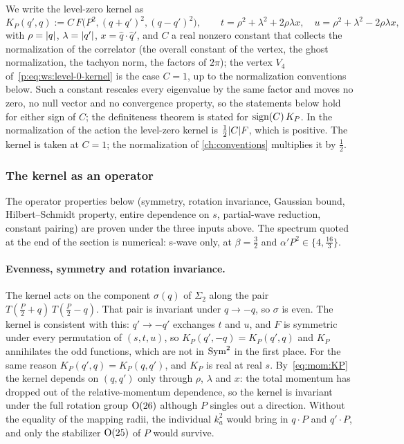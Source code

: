 We write the level-zero kernel as
\begin{equation}
  \label{eq:mom:KP}
  K_P(q', q)
    := C \, F\big( P^2, (q + q')^2, (q - q')^2 \big),
  \qquad
  t
    = \rho^2 + \lambda^2 + 2 \rho \lambda x,
  \quad
  u
    = \rho^2 + \lambda^2 - 2 \rho \lambda x,
\end{equation}
with $\rho = {|q|}$, $\lambda = {|q'|}$, $x = \hat q \cdot \hat q'$, and $C$ a real nonzero constant that collects the normalization of the correlator (the overall constant of the vertex, the ghost normalization, the tachyon norm, the factors of $2\pi$); the vertex $V_4$ of~\eqref{p:eq:ws:level-0-kernel} is the case $C = 1$, up to the normalization conventions below.
Such a constant rescales every eigenvalue by the same factor and moves no zero, no null vector and no convergence property, so the statements below hold for either sign of $C$; the definiteness theorem is stated for $\operatorname{sign}(C) \, K_P$.
In the normalization of the action the level-zero kernel is $\tfrac{1}{2} {|C|} F$, which is positive.
The kernel is taken at $C = 1$; the normalization of \cref{ch:conventions} multiplies it by $\tfrac{1}{2}$.

\subsubsection{The kernel as an operator}
\label{sec:mom:hs}


The operator properties below (symmetry, rotation invariance, Gaussian bound, Hilbert--Schmidt property, entire dependence on $s$, partial-wave reduction, constant pairing) are proven under the three inputs above.
The spectrum quoted at the end of the section is numerical: s-wave only, at $\beta = \tfrac{3}{2}$ and $\alpha' P^2 \in \{4, \tfrac{16}{3}\}$.

\paragraph{Evenness, symmetry and rotation invariance.}
The kernel acts on the component $\sigma(q)$ of $\Sigma_2$ along the pair $T(\tfrac{P}{2} + q) \, T(\tfrac{P}{2} - q)$.
That pair is invariant under $q \to - q$, so $\sigma$ is even.
The kernel is consistent with this: $q' \to - q'$ exchanges $t$ and $u$, and $F$ is symmetric under every permutation of $(s, t, u)$, so $K_P(q', - q) = K_P(q', q)$ and $K_P$ annihilates the odd functions, which are not in $\operatorname{Sym}^2$ in the first place.
For the same reason $K_P(q', q) = K_P(q, q')$, and $K_P$ is real at real $s$.
By~\eqref{eq:mom:KP} the kernel depends on $(q, q')$ only through $\rho$, $\lambda$ and $x$: the total momentum has dropped out of the relative-momentum dependence, so the kernel is invariant under the full rotation group $\mathrm{O}(26)$ although $P$ singles out a direction.
Without the equality of the mapping radii, the individual $k_a^2$ would bring in $q \cdot P$ and $q' \cdot P$, and only the stabilizer $\mathrm{O}(25)$ of $P$ would survive.


